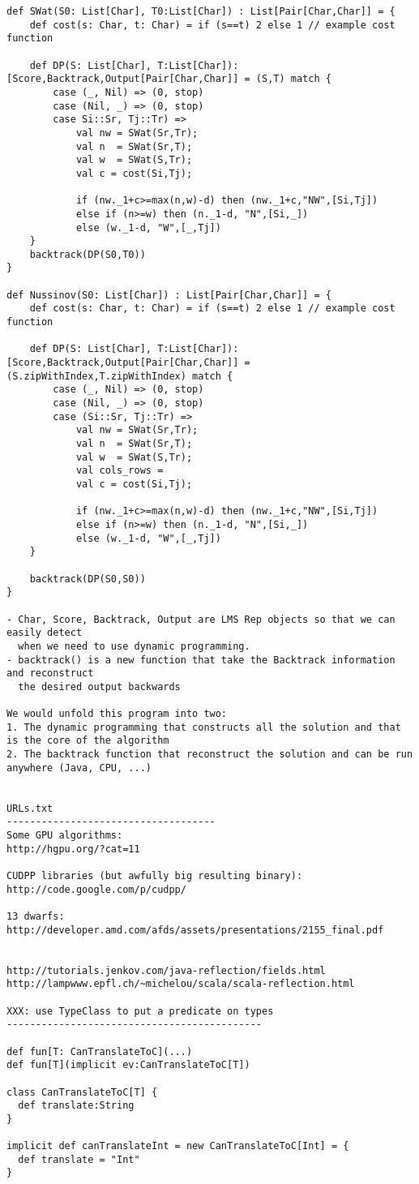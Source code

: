 \documentclass[11pt]{article}
\begin{document}
\begin{verbatim}
def SWat(S0: List[Char], T0:List[Char]) : List[Pair[Char,Char]] = {
	def cost(s: Char, t: Char) = if (s==t) 2 else 1 // example cost function

	def DP(S: List[Char], T:List[Char]): [Score,Backtrack,Output[Pair[Char,Char]] = (S,T) match {
		case (_, Nil) => (0, stop)
		case (Nil, _) => (0, stop)
		case Si::Sr, Tj::Tr) =>
			val nw = SWat(Sr,Tr);
			val n  = SWat(Sr,T);
			val w  = SWat(S,Tr);
			val c = cost(Si,Tj);

			if (nw._1+c>=max(n,w)-d) then (nw._1+c,"NW",[Si,Tj])
			else if (n>=w) then (n._1-d, "N",[Si,_])
			else (w._1-d, "W",[_,Tj])
	}
	backtrack(DP(S0,T0))
}

def Nussinov(S0: List[Char]) : List[Pair[Char,Char]] = {
	def cost(s: Char, t: Char) = if (s==t) 2 else 1 // example cost function

	def DP(S: List[Char], T:List[Char]): [Score,Backtrack,Output[Pair[Char,Char]] = (S.zipWithIndex,T.zipWithIndex) match {
		case (_, Nil) => (0, stop)
		case (Nil, _) => (0, stop)
		case (Si::Sr, Tj::Tr) =>
			val nw = SWat(Sr,Tr);
			val n  = SWat(Sr,T);
			val w  = SWat(S,Tr);
			val cols_rows = 
			val c = cost(Si,Tj);

			if (nw._1+c>=max(n,w)-d) then (nw._1+c,"NW",[Si,Tj])
			else if (n>=w) then (n._1-d, "N",[Si,_])
			else (w._1-d, "W",[_,Tj])
	}

	backtrack(DP(S0,S0))
}

- Char, Score, Backtrack, Output are LMS Rep objects so that we can easily detect
  when we need to use dynamic programming.
- backtrack() is a new function that take the Backtrack information and reconstruct
  the desired output backwards

We would unfold this program into two:
1. The dynamic programming that constructs all the solution and that is the core of the algorithm
2. The backtrack function that reconstruct the solution and can be run anywhere (Java, CPU, ...)


URLs.txt
------------------------------------
Some GPU algorithms:
http://hgpu.org/?cat=11

CUDPP libraries (but awfully big resulting binary):
http://code.google.com/p/cudpp/

13 dwarfs:
http://developer.amd.com/afds/assets/presentations/2155_final.pdf


http://tutorials.jenkov.com/java-reflection/fields.html
http://lampwww.epfl.ch/~michelou/scala/scala-reflection.html

XXX: use TypeClass to put a predicate on types
--------------------------------------------

def fun[T: CanTranslateToC](...)
def fun[T](implicit ev:CanTranslateToC[T])

class CanTranslateToC[T] {
  def translate:String
}

implicit def canTranslateInt = new CanTranslateToC[Int] = {
  def translate = "Int"
}

\end{verbatim}

\newpage


\end{document}
